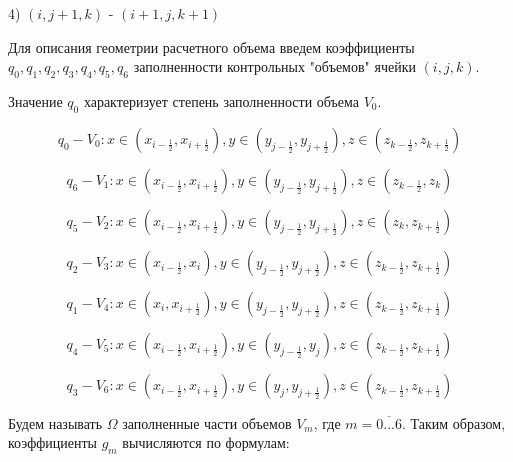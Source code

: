 \documentclass[12pt]{article}
\begin{document}
4) ${(i,j+1,k)}$ - ${(i+1,j,k+1)}$ 

{\color{red}{Читай метод конечных объемов (Рояк)}}


Для описания геометрии расчетного объема введем коэффициенты ${q_0, q_1,q_2,q_3,q_4,q_5,q_6}$ заполненности контрольных "объемов" ячейки ${(i,j,k)}$.

Значение ${q_0}$ характеризует степень заполненности объема ${V_0}$.

\begin{equation*}
{q_0} - {V_0}: x\in (x_{i-\frac{1}{2} }, x_{i+\frac{1}{2} } ),  y\in (y_{j-\frac{1}{2} }, y_{j+\frac{1}{2} } ),  z\in (z_{k-\frac{1}{2} }, z_{k+\frac{1}{2} } )
\end{equation*}

\begin{equation*}
{q_6} - {V_1}: x\in (x_{i-\frac{1}{2} }, x_{i+\frac{1}{2} } ),  y\in (y_{j-\frac{1}{2} }, y_{j+\frac{1}{2} } ),  z\in (z_{k-\frac{1}{2} }, z_k )
\end{equation*}

\begin{equation*}
{q_5} - {V_2}: x\in (x_{i-\frac{1}{2} }, x_{i+\frac{1}{2} } ),  y\in (y_{j-\frac{1}{2} }, y_{j+\frac{1}{2} } ),  z\in (z_k, z_{k+\frac{1}{2} } )
\end{equation*}

\begin{equation*}
{q_2} - {V_3}: x\in (x_{i-\frac{1}{2} }, x_i ),  y\in (y_{j-\frac{1}{2} }, y_{j+\frac{1}{2} } ),  z\in (z_{k-\frac{1}{2} }, z_{k+\frac{1}{2} } )
\end{equation*}

\begin{equation*}
{q_1} - {V_4}: x\in (x_i, x_{i+\frac{1}{2} } ),  y\in (y_{j-\frac{1}{2} }, y_{j+\frac{1}{2} } ),  z\in (z_{k-\frac{1}{2} }, z_{k+\frac{1}{2} } )
\end{equation*}

\begin{equation*}
{q_4} - {V_5}: x\in (x_{i-\frac{1}{2} }, x_{i+\frac{1}{2} } ),  y\in (y_{j-\frac{1}{2} }, y_j ),  z\in (z_{k-\frac{1}{2} }, z_{k+\frac{1}{2} } )
\end{equation*}

\begin{equation*}
{q_3} - {V_6}: x\in (x_{i-\frac{1}{2} }, x_{i+\frac{1}{2} } ),  y\in (y_j, y_{j+\frac{1}{2} } ),  z\in (z_{k-\frac{1}{2} }, z_{k+\frac{1}{2} } )
\end{equation*}

Будем называть $\Omega$ заполненные части объемов $V_m$, где $m=\overline{0...6}$. 
Таким образом, коэффициенты $g_m$ вычисляются по формулам:
\end{document}
